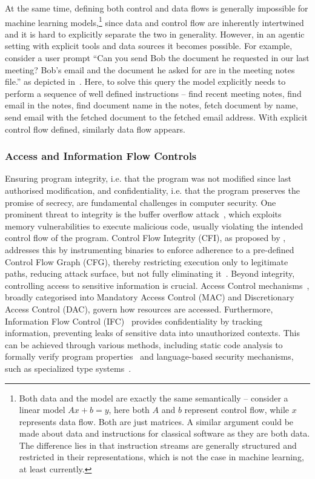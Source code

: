 \documentclass[11pt, a4paper, logo, copyright]{googledeepmind}
\begin{document}
At the same time, defining both control and data flows is generally impossible for machine learning models,\footnote{Both data and the model are exactly the same semantically -- consider a linear model $Ax+b=y$, here both $A$ and $b$ represent control flow, while $x$ represents data flow. Both are just matrices. A similar argument could be made about data and instructions for classical software as they are both data. The difference lies in that instruction streams are generally structured and restricted in their representations, which is not the case in machine learning, at least currently.} since data and control flow are inherently intertwined and it is hard to explicitly separate the two in generality. However, in an agentic setting with explicit tools and data sources it becomes possible. For example, consider a user prompt ``Can you send Bob the document he requested in our last meeting? Bob's email and the document he asked for are in the meeting notes file.'' as depicted in~. Here, to solve this query the model explicitly needs to perform a sequence of well defined instructions -- find recent meeting notes, find email in the notes, find document name in the notes, fetch document by name, send email with the fetched document to the fetched email address. With explicit control flow defined, similarly data flow appears.

\subsubsection{Access and Information Flow Controls}\label{app:ac-ifc}

Ensuring program integrity, i.e. that the program was not modified since last authorised modification, and confidentiality, i.e. that the program preserves the promise of secrecy, are fundamental challenges in computer security. One prominent threat to integrity is the buffer overflow attack~\citep{aleph1996smashing}, which exploits memory vulnerabilities to execute malicious code, usually violating the intended control flow of the program. Control Flow Integrity (CFI), as proposed by \citet{abadi2009control}, addresses this by instrumenting binaries to enforce adherence to a pre-defined Control Flow Graph (CFG), thereby restricting execution only to legitimate paths, reducing attack surface, but not fully eliminating it~\citep{carlini2014rop}. Beyond integrity, controlling access to sensitive information is crucial. Access Control mechanisms~\citep{anderson2010security}, broadly categorised into Mandatory Access Control (MAC) and Discretionary Access Control (DAC), govern how resources are accessed. Furthermore, Information Flow Control (IFC)~\citep{denning1976lattice,myers1997decentralized} provides confidentiality by tracking information, preventing leaks of sensitive data into unauthorized contexts. This can be achieved through various methods, including static code analysis to formally verify program properties~\citep{dennind1977certification} and language-based security mechanisms, such as specialized type systems~\citep{sabelfeld2003language}.
\end{document}
